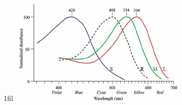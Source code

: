 \documentclass[13pt,a4paper]{article}
\makeatletter
\newcommand*{\centerfloat}{%
  \parindent \z@
  \leftskip \z@ \@plus 1fil \@minus \textwidth
  \rightskip\leftskip
  \parfillskip \z@skip}
\makeatother
\begin{document}
\begin{enumerate}
  \begin{figure}[h]
    \centerfloat
    \includegraphics[width=0.75\textwidth]{img/conos.png}
  \end{figure}
\end{enumerate}


    \setlength{\parskip}{1em}
    \newpage
\end{document}
